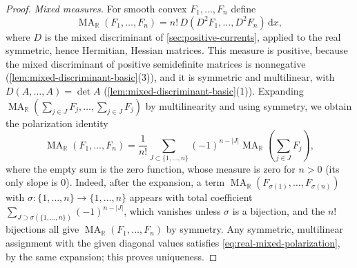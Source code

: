 \begin{proof}
\emph{Mixed measures.} For smooth convex $F_1,\ldots,F_n$ define
\[
 \operatorname{MA}_{\mathbb R}(F_1,\ldots,F_n)=n!\,D(D^2F_1,\ldots,D^2F_n)\,\mathrm dx,
\]
where $D$ is the mixed discriminant of \cref{sec:positive-currents}, applied to the real symmetric, hence Hermitian, Hessian matrices. This measure is positive, because the mixed discriminant of positive semidefinite matrices is nonnegative (\cref{lem:mixed-discriminant-basic}(3)), and it is symmetric and multilinear, with $D(A,\ldots,A)=\det A$ (\cref{lem:mixed-discriminant-basic}(1)). Expanding $\operatorname{MA}_{\mathbb R}(\sum_{j\in J}F_j,\ldots,\sum_{j\in J}F_j)$ by multilinearity and using symmetry, we obtain the polarization identity
\begin{equation}\label{eq:real-mixed-polarization}
 \operatorname{MA}_{\mathbb R}(F_1,\ldots,F_n)=\frac1{n!}\sum_{J\subset\{1,\ldots,n\}}
          (-1)^{n-|J|}\operatorname{MA}_{\mathbb R}
                                 \left(\sum_{j\in J}F_j\right),
\end{equation}
where the empty sum is the zero function, whose measure is zero for $n>0$ (its only slope is $0$). Indeed, after the expansion, a term $\operatorname{MA}_{\mathbb R}(F_{\sigma(1)},\ldots,F_{\sigma(n)})$ with $\sigma\colon\{1,\ldots,n\}\to\{1,\ldots,n\}$ appears with total coefficient $\sum_{J\supset\sigma(\{1,\ldots,n\})}(-1)^{n-|J|}$, which vanishes unless $\sigma$ is a bijection, and the $n!$ bijections all give $\operatorname{MA}_{\mathbb R}(F_1,\ldots,F_n)$ by symmetry. Any symmetric, multilinear assignment with the given diagonal values satisfies \eqref{eq:real-mixed-polarization}, by the same expansion; this proves uniqueness.


\end{proof}
